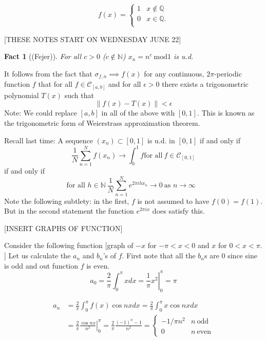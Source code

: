 \documentclass{article}
\newtheorem{fact}{Fact}[section]
\begin{document}
\[ f(x) =   \left\{
\begin{array}{ll}
      1 &  x \notin \mathbb{Q} \\
      0 &  x \in \mathbb{Q} .  \\
\end{array} 
\right. \]

[THESE NOTES START ON WEDNESDAY JUNE 22]
\begin{fact}[(Fejer)] 
For all $c>0$ ($c \not\in \mathbb{N}$) $x_n = n^c \ \textrm{mod} 1$ is u.d. 
\end{fact}

It follows from the fact that $\sigma_{f,n} \implies f(x)$ for any continuous, $2\pi$-periodic function $f$ that for all $f\in \mathscr{C}_{[a,b]}$ and for all $\epsilon> 0$ there exists a trigonometric polynomial $T(x)$ such that 
$$ \| f(x) - T(x) \| < \epsilon$$
Note: We could replace $[a,b]$ in all of the above with $[0,1]$. 
This is known as the trigonometric form of Weierstrass approximation theorem. 

Recall last time: A sequence $(x_n)\subset [0,1]$ is u.d. in $[0,1]$ if and only if
\begin{equation}
    \frac1N\sum_{n=1}^N f(x_n) \to \int_0^1 f \text{for all} \ f\in \mathscr{C}_{[0,1]}
\end{equation}
if and only if
\begin{equation}
    \text{for all $h\in \mathbb{N}$} \ \frac1N\sum_{n=1}^N e^{2\pi i h x_n} \to 0 \ \text{as $n\to \infty$ } 
\end{equation}
Note the following subtlety: in the first, $f$ is not assumed to have $f(0)=f(1)$. But in the second statement the function $e^{2\pi i x}$ does satisfy this. 

[INSERT GRAPHS OF FUNCTION]

Consider the following function [graph of $-x$ for $-\pi < x < 0$ and $x$ for $0<x<\pi$. ]
Let us calculate the $a_n$ and $b_n$'s of $f$. First note that all the $b_n$s are 0 since sine is odd and out function $f$ is even. 
\begin{equation}
    a_0 = \frac2\pi\int_0^\pi xdx =\left. \frac1\pi x^2\right|_0^\pi = \pi
\end{equation}


\begin{align} 
   a_n & = \frac2\pi \int_0^\pi f(x) \cos n x dx = \frac 2\pi \int_0^\pi x\cos nx dx \\
       & =  \left.\frac{2}{\pi}\frac{\cos n x}{n^2}\right|_0^\pi 
         = \frac{2}\pi \frac{(-1)^n -1 }{n^2} 
         = \begin{cases}
           -1/\pi n^2 & n\ \text{odd}\\
           0          & n\ \text{even}
       \end{cases}
\end{align}
\end{document}
